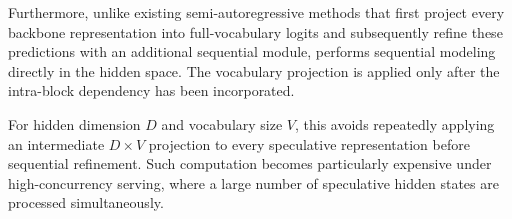 Furthermore, unlike existing semi-autoregressive methods that first project every backbone representation into full-vocabulary logits and subsequently refine these predictions with an additional sequential module, \we performs sequential modeling directly in the hidden space. The vocabulary projection is applied only after the intra-block dependency has been incorporated.

For hidden dimension \(D\) and vocabulary size \(V\), this avoids repeatedly applying an intermediate \(D\times V\) projection to every speculative representation before sequential refinement. Such computation becomes particularly expensive under high-concurrency serving, where a large number of speculative hidden states are processed simultaneously.






